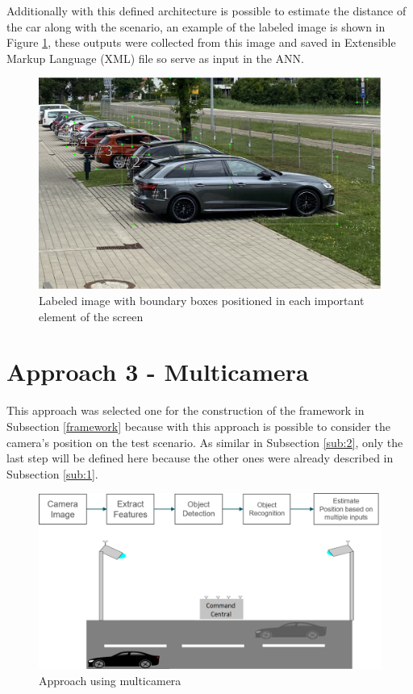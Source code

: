 Additionally with this defined architecture is possible to estimate the distance of the car along with the scenario, an example of the labeled image is shown in Figure \ref{fig:boundary_boxes_car}, these outputs were collected from this image and saved in Extensible Markup Language (XML) file so serve as input in the ANN. 


\begin{figure}[H]
\centering
\includegraphics[width=\textwidth]{imagens/boundary_boxes.JPG}
\caption{Labeled image with boundary boxes positioned in each important element of the screen}
\label{fig:boundary_boxes_car}
\end{figure}




\section{Approach 3 - Multicamera}\label{sub:3}

This approach was selected one for the construction of the framework in Subsection \ref{framework} because with this approach is possible to consider the camera's position on the test scenario. As similar in Subsection \ref{sub:2}, only the last step will be defined here because the other ones were already described in Subsection \ref{sub:1}. 


\begin{figure}[H]
\centering
\includegraphics[width=\textwidth]{imagens/proposal3.png}
\caption{Approach using multicamera}
\label{fig:proposal3}
\end{figure}

